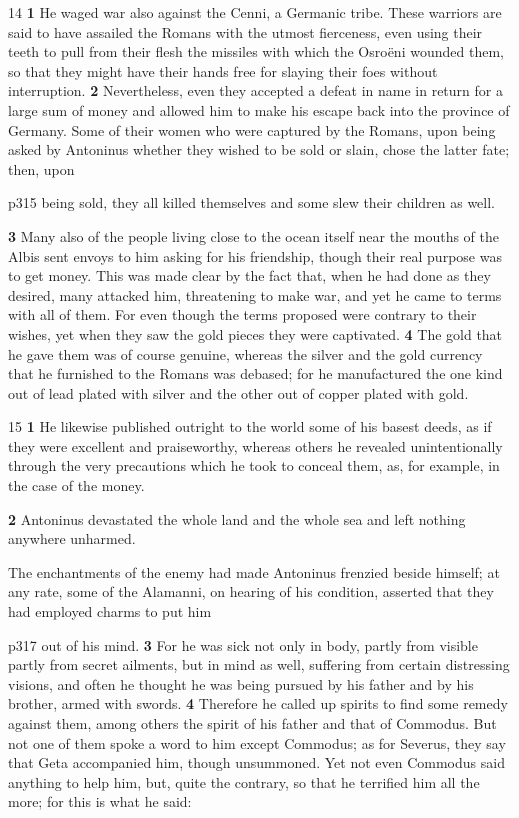 14
\textbf{1} He waged war also against the Cenni, a Germanic tribe. These warriors are said to have assailed the Romans with the utmost fierceness, even using their teeth to pull from their flesh the missiles with which the Osroëni wounded them, so that they might have their hands free for slaying their foes without interruption. \textbf{2} Nevertheless, even they accepted a defeat in name in return for a large sum of money and allowed him to make his escape back into the province of Germany. Some of their women who were captured by the Romans, upon being asked by Antoninus whether they wished to be sold or slain, chose the latter fate; then, upon

p315 being sold, they all killed themselves and some slew their children as well.

\textbf{3} Many also of the people living close to the ocean itself near the mouths of the Albis sent envoys to him asking for his friendship, though their real purpose was to get money. This was made clear by the fact that, when he had done as they desired, many attacked him, threatening to make war, and yet he came to terms with all of them. For even though the terms proposed were contrary to their wishes, yet when they saw the gold pieces they were captivated. \textbf{4} The gold that he gave them was of course genuine, whereas the silver and the gold currency that he furnished to the Romans was debased; for he manufactured the one kind out of lead plated with silver and the other out of copper plated with gold.

15
\textbf{1} He likewise published outright to the world some of his basest deeds, as if they were excellent and praiseworthy, whereas others he revealed unintentionally through the very precautions which he took to conceal them, as, for example, in the case of the money.

\textbf{2} Antoninus devastated the whole land and the whole sea and left nothing anywhere unharmed.

The enchantments of the enemy had made Antoninus frenzied beside himself; at any rate, some of the Alamanni, on hearing of his condition, asserted that they had employed charms to put him

p317 out of his mind. \textbf{3} For he was sick not only in body, partly from visible partly from secret ailments, but in mind as well, suffering from certain distressing visions, and often he thought he was being pursued by his father and by his brother, armed with swords. \textbf{4} Therefore he called up spirits to find some remedy against them, among others the spirit of his father and that of Commodus. But not one of them spoke a word to him except Commodus; as for Severus, they say that Geta accompanied him, though unsummoned. Yet not even Commodus said anything to help him, but, quite the contrary, so that he terrified him all the more; for this is what he said:

